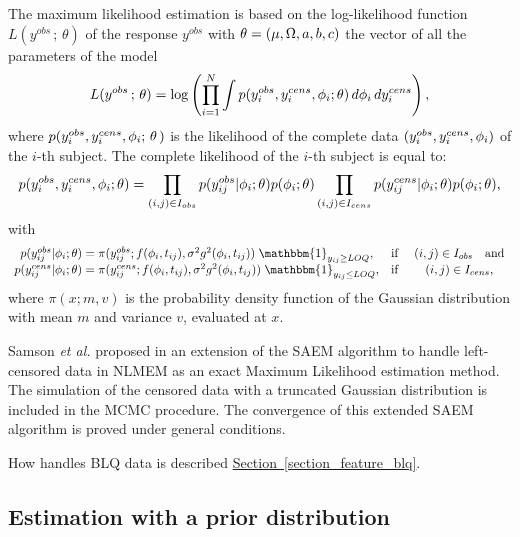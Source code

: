 The maximum likelihood estimation is based on the log-likelihood function $L(y^{obs} \,; \, \theta)$ of the response $y^{obs}$ with
$\theta=(\fixed_effect,\IIV, \ag,\bg,\cg )$ the vector of all the parameters of the model
\begin{equation}
L(y^{obs} \,; \,\theta )=%
\log \left( \prod_{i=1}^{N} \int p(y_i^{obs} ,y_i^{cens},\phig_i;\theta) \, d\phig_i\,
dy_i^{cens}\right),\label{lik}
\end{equation}
where $p(y_i^{obs} ,y_i^{cens},{\phi}_i;\,\theta\,)$ is the likelihood of the complete data
$(y_i^{obs},y_i^{cens},  {\phi}_i)$ of the $i$-th subject. The complete likelihood of the $i$-th
subject is equal to:
$$p(y_i^{obs},y_i^{cens},{\phi}_i;\theta)= \prod_{(i,j) \in I_{obs} } p(y_{ij}^{obs}|{\phi}_i;\theta)p({\phi}_i;\theta)\prod_{(i,j)
\in I_{cens} } p(y_{ij}^{cens}|{\phi}_i;\theta)p({\phi}_i;\theta),
$$
with
\begin{equation*}
\begin{array}{ccc}
p(y_{ij}^{obs}|\phig_i;\theta)=\pi(y_{ij}^{obs};f(\phig_i,t_{ij}),\sigma^2g^2(\phig_i,t_{ij}))\; \mathbbm{1}_{y_{ij}\geq LOQ},
 &\mbox{if } & (i,j) \in I_{obs} \hspace{1em}\text{and} \\
p(y_{ij}^{cens}|\phig_i;\theta)= \pi(y_{ij}^{cens};f(\phig_i,t_{ij}),\sigma^2g^2(\phig_i,t_{ij}))\;
\mathbbm{1}_{y_{ij}\leq LOQ}, & \mbox{if } & (i,j) \in I_{cens}  ,
\end{array}
\end{equation*}
where $\pi(x;m,v)$ is the probability density function of the Gaussian distribution with mean $m$
and variance $v$, evaluated at $x$.

Samson {\it et al.} proposed in \cite{samson_csda06}  an extension of the SAEM algorithm to handle left-censored data in NLMEM as an exact Maximum
Likelihood estimation method. The simulation of the censored data with a truncated Gaussian distribution is included in the MCMC procedure. The
convergence of this extended SAEM algorithm is proved under general conditions.

How  \monolix handles BLQ data is described \hyperref[section_feature_blq]{Section~\ref*{section_feature_blq}}.

\subsection{Estimation with a prior distribution} \label{section_methodo_prior}

